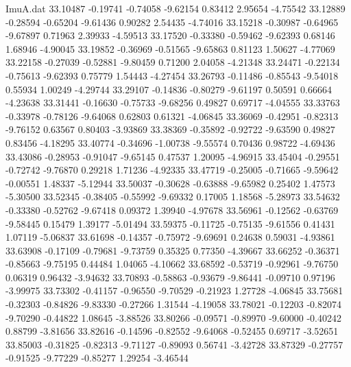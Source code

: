 \begin{filecontents}{ImuA.dat}
  33.10487   -0.19741   -0.74058   -9.62154    0.83412    2.95654   -4.75542
  33.12889   -0.28594   -0.65204   -9.61436    0.90282    2.54435   -4.74016
  33.15218   -0.30987   -0.64965   -9.67897    0.71963    2.39933   -4.59513
  33.17520   -0.33380   -0.59462   -9.62393    0.68146    1.68946   -4.90045
  33.19852   -0.36969   -0.51565   -9.65863    0.81123    1.50627   -4.77069
  33.22158   -0.27039   -0.52881   -9.80459    0.71200    2.04058   -4.21348
  33.24471   -0.22134   -0.75613   -9.62393    0.75779    1.54443   -4.27454
  33.26793   -0.11486   -0.85543   -9.54018    0.55934    1.00249   -4.29744
  33.29107   -0.14836   -0.80279   -9.61197    0.50591    0.66664   -4.23638
  33.31441   -0.16630   -0.75733   -9.68256    0.49827    0.69717   -4.04555
  33.33763   -0.33978   -0.78126   -9.64068    0.62803    0.61321   -4.06845
  33.36069   -0.42951   -0.82313   -9.76152    0.63567    0.80403   -3.93869
  33.38369   -0.35892   -0.92722   -9.63590    0.49827    0.83456   -4.18295
  33.40774   -0.34696   -1.00738   -9.55574    0.70436    0.98722   -4.69436
  33.43086   -0.28953   -0.91047   -9.65145    0.47537    1.20095   -4.96915
  33.45404   -0.29551   -0.72742   -9.76870    0.29218    1.71236   -4.92335
  33.47719   -0.25005   -0.71665   -9.59642   -0.00551    1.48337   -5.12944
  33.50037   -0.30628   -0.63888   -9.65982    0.25402    1.47573   -5.30500
  33.52345   -0.38405   -0.55992   -9.69332    0.17005    1.18568   -5.28973
  33.54632   -0.33380   -0.52762   -9.67418    0.09372    1.39940   -4.97678
  33.56961   -0.12562   -0.63769   -9.58445    0.15479    1.39177   -5.01494
  33.59375   -0.11725   -0.75135   -9.61556    0.41431    1.07119   -5.06837
  33.61698   -0.14357   -0.75972   -9.69691    0.24638    0.59031   -4.93861
  33.63908   -0.17109   -0.79681   -9.73759    0.35325    0.77350   -4.39667
  33.66252   -0.36371   -0.85663   -9.75195    0.44484    1.04065   -4.10662
  33.68592   -0.53719   -0.92961   -9.76750    0.06319    0.96432   -3.94632
  33.70893   -0.58863   -0.93679   -9.86441   -0.09710    0.97196   -3.99975
  33.73302   -0.41157   -0.96550   -9.70529   -0.21923    1.27728   -4.06845
  33.75681   -0.32303   -0.84826   -9.83330   -0.27266    1.31544   -4.19058
  33.78021   -0.12203   -0.82074   -9.70290   -0.44822    1.08645   -3.88526
  33.80266   -0.09571   -0.89970   -9.60000   -0.40242    0.88799   -3.81656
  33.82616   -0.14596   -0.82552   -9.64068   -0.52455    0.69717   -3.52651
  33.85003   -0.31825   -0.82313   -9.71127   -0.89093    0.56741   -3.42728
  33.87329   -0.27757   -0.91525   -9.77229   -0.85277    1.29254   -3.46544

\end{filecontents}
